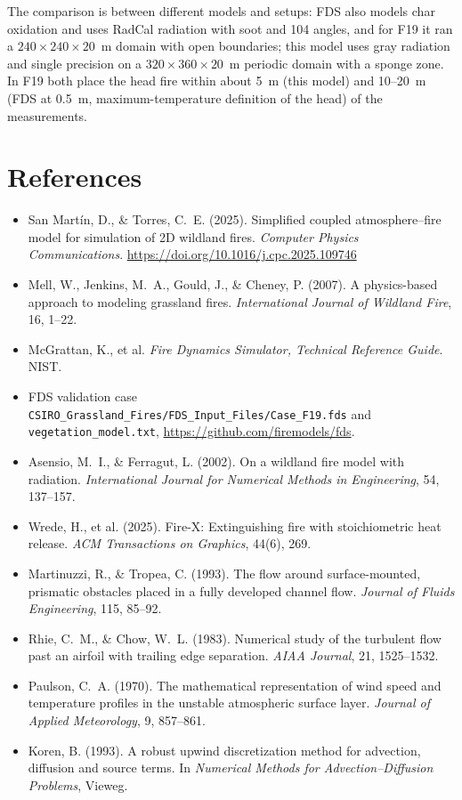 \documentclass[11pt,a4paper]{article}
\newcommand{\code}[1]{\texttt{#1}}
\begin{document}
The comparison is between different models and setups: FDS also models char oxidation and uses RadCal
radiation with soot and 104 angles, and for F19 it ran a $240\times240\times20$~m domain with open boundaries; this
model uses gray radiation and single precision on a $320\times360\times20$~m periodic domain with a sponge zone.
In F19 both place the head fire within about 5~m (this model) and 10--20~m (FDS at 0.5~m, maximum-temperature
definition of the head) of the measurements.

\section*{References}
\begin{itemize}
  \item San Mart\'in, D., \& Torres, C.~E. (2025). Simplified coupled atmosphere--fire model for
        simulation of 2D wildland fires. \emph{Computer Physics Communications}.
        \url{https://doi.org/10.1016/j.cpc.2025.109746}
  \item Mell, W., Jenkins, M.~A., Gould, J., \& Cheney, P. (2007). A physics-based approach to
        modeling grassland fires. \emph{International Journal of Wildland Fire}, 16, 1--22.
  \item McGrattan, K., et al. \emph{Fire Dynamics Simulator, Technical Reference Guide}. NIST.
  \item FDS validation case \code{CSIRO\_Grassland\_Fires/FDS\_Input\_Files/Case\_F19.fds} and
        \code{vegetation\_model.txt}, \url{https://github.com/firemodels/fds}.
  \item Asensio, M.~I., \& Ferragut, L. (2002). On a wildland fire model with radiation.
        \emph{International Journal for Numerical Methods in Engineering}, 54, 137--157.
  \item Wrede, H., et al. (2025). Fire-X: Extinguishing fire with stoichiometric heat release.
        \emph{ACM Transactions on Graphics}, 44(6), 269.
  \item Martinuzzi, R., \& Tropea, C. (1993). The flow around surface-mounted, prismatic obstacles
        placed in a fully developed channel flow. \emph{Journal of Fluids Engineering}, 115, 85--92.
  \item Rhie, C.~M., \& Chow, W.~L. (1983). Numerical study of the turbulent flow past an airfoil
        with trailing edge separation. \emph{AIAA Journal}, 21, 1525--1532.
  \item Paulson, C.~A. (1970). The mathematical representation of wind speed and temperature
        profiles in the unstable atmospheric surface layer. \emph{Journal of Applied Meteorology}, 9,
        857--861.
  \item Koren, B. (1993). A robust upwind discretization method for advection, diffusion and
        source terms. In \emph{Numerical Methods for Advection--Diffusion Problems}, Vieweg.
\end{itemize}
\end{document}
